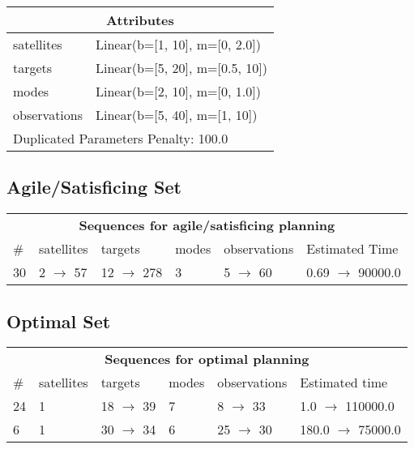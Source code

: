 \documentclass{article}
\begin{document}
                    \begin{center}
                    \begin{tabular}{p{}p{}}
                    \multicolumn{2}{c}{\bf \large Attributes}\\\midrule
                    satellites & Linear(b=[1, 10], m=[0, 2.0])\\
targets & Linear(b=[5, 20], m=[0.5, 10])\\
modes & Linear(b=[2, 10], m=[0, 1.0])\\
observations & Linear(b=[5, 40], m=[1, 10])
                    
                     \\\midrule
                    \multicolumn{2}{l}{Duplicated Parameters Penalty: 100.0}
                    \end{tabular}
                    \end{center}
                
                         \subsection*{Agile/Satisficing Set}

                        \begin{center}
                        \begin{tabular}{l|l|l|l|l|l}
                        \multicolumn{6}{c}{\bf \large Sequences for agile/satisficing planning}\\
                        \# & satellites & targets & modes & observations & Estimated Time\\\midrule
                        30&2 $\rightarrow$ 57&12 $\rightarrow$ 278&3&5 $\rightarrow$ 60&0.69 $\rightarrow$ 90000.0
                        \end{tabular}
                        \end{center}
                    
                            \subsection*{Optimal Set}

                            \begin{center}
                            \begin{tabular}{l|l|l|l|l|l}
                            \multicolumn{6}{c}{\bf \large Sequences for optimal planning}\\
                            \# & satellites & targets & modes & observations & Estimated time\\\midrule
                            24&1&18 $\rightarrow$ 39&7&8 $\rightarrow$ 33&1.0 $\rightarrow$ 110000.0\\
6&1&30 $\rightarrow$ 34&6&25 $\rightarrow$ 30&180.0 $\rightarrow$ 75000.0
                            \end{tabular}
                            \end{center}
                    
\end{document}
